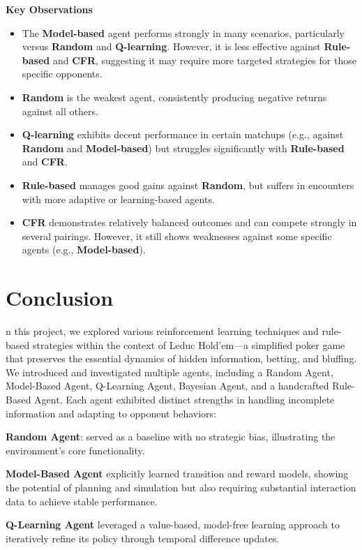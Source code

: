 \documentclass{article}
\begin{document}
\textbf{Key Observations}

\begin{itemize}
    \item The \textbf{Model-based} agent performs strongly in many scenarios, particularly versus \textbf{Random} and \textbf{Q-learning}. However, it is less effective against \textbf{Rule-based} and \textbf{CFR}, suggesting it may require more targeted strategies for those specific opponents.
    \item \textbf{Random} is the weakest agent, consistently producing negative returns against all others.
    \item \textbf{Q-learning} exhibits decent performance in certain matchups (e.g., against \textbf{Random} and \textbf{Model-based}) but struggles significantly with \textbf{Rule-based} and \textbf{CFR}.
    \item \textbf{Rule-based} manages good gains against \textbf{Random}, but suffers in encounters with more adaptive or learning-based agents.
    \item \textbf{CFR} demonstrates relatively balanced outcomes and can compete strongly in several pairings. However, it still shows weaknesses against some specific agents (e.g., \textbf{Model-based}).
\end{itemize}

\section{Conclusion}
n this project, we explored various reinforcement learning techniques and rule-based strategies within the context of Leduc Hold’em—a simplified poker game that preserves the essential dynamics of hidden information, betting, and bluffing. We introduced and investigated multiple agents, including a Random Agent, Model-Based Agent, Q-Learning Agent, Bayesian Agent, and a handcrafted Rule-Based Agent. Each agent exhibited distinct strengths in handling incomplete information and adapting to opponent behaviors:

    \textbf{Random Agent}: served as a baseline with no strategic bias, illustrating the environment’s core functionality.

    \textbf{Model-Based Agent} explicitly learned transition and reward models, showing the potential of planning and simulation but also requiring substantial interaction data to achieve stable performance.

    \textbf{Q-Learning Agent} leveraged a value-based, model-free learning approach to iteratively refine its policy through temporal difference updates.
\end{document}
